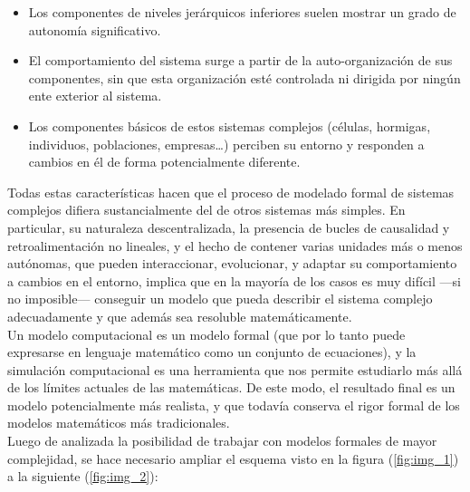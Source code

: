 \begin{itemize}
	\item Los componentes de niveles jerárquicos inferiores suelen mostrar un grado de autonomía significativo.
	\item El comportamiento del sistema surge a partir de la auto-organización de sus componentes, sin que esta organización esté controlada ni dirigida por ningún ente exterior al sistema.
	\item Los componentes básicos de estos sistemas complejos (células, hormigas, individuos, poblaciones, empresas…) perciben su entorno y responden a cambios en él de forma potencialmente diferente.
\end{itemize}

Todas estas características hacen que el proceso de modelado formal de sistemas complejos difiera sustancialmente del de otros sistemas más simples. En particular, su naturaleza descentralizada, la presencia de bucles de causalidad y retroalimentación no lineales, y el hecho de contener varias unidades más o menos autónomas, que pueden interaccionar, evolucionar, y adaptar su comportamiento a cambios en el entorno, implica que en la mayoría de los casos es muy difícil —si no imposible— conseguir un modelo que pueda describir el sistema complejo adecuadamente y que además sea resoluble matemáticamente. \parencite{izquierdo2008modelado}\\

Un modelo computacional es un modelo formal (que por lo tanto puede expresarse en lenguaje matemático como un conjunto de ecuaciones), y la simulación computacional es una herramienta que nos permite estudiarlo más allá de los límites actuales de las matemáticas. De este modo, el resultado final es un modelo potencialmente más realista, y que todavía conserva el rigor formal de los modelos matemáticos más tradicionales. \parencite{izquierdo2008modelado}\\

Luego de analizada la posibilidad de trabajar con modelos formales de mayor complejidad, se hace necesario ampliar el esquema visto en la figura (\ref{fig:img_1}) a la siguiente (\ref{fig:img_2}):

